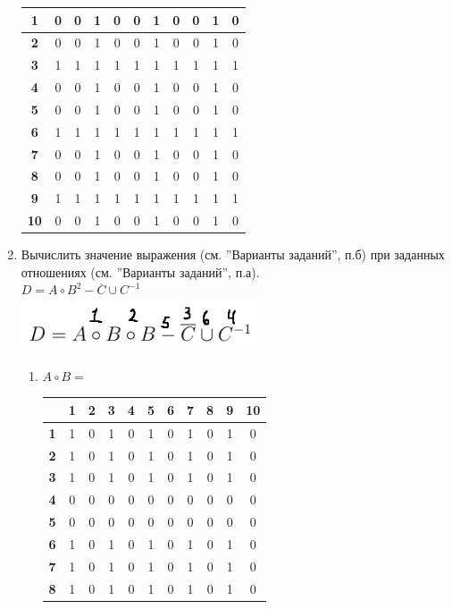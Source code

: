 \documentclass[a4paper,14pt]{extarticle}
\begin{document}
\begin{enumerate}[label=1.\arabic*.]
\begin{center}
\begin{tabular}{|c|c|c|c|c|c|c|c|c|c|c|}
    			\hline\textbf{1}&0&0&1&0&0&1&0&0&1&0\\
    			\hline\textbf{2}&0&0&1&0&0&1&0&0&1&0\\
    			\hline\textbf{3}&1&1&1&1&1&1&1&1&1&1\\
    			\hline\textbf{4}&0&0&1&0&0&1&0&0&1&0\\
    			\hline\textbf{5}&0&0&1&0&0&1&0&0&1&0\\
    			\hline\textbf{6}&1&1&1&1&1&1&1&1&1&1\\
    			\hline\textbf{7}&0&0&1&0&0&1&0&0&1&0\\
    			\hline\textbf{8}&0&0&1&0&0&1&0&0&1&0\\
    			\hline\textbf{9}&1&1&1&1&1&1&1&1&1&1\\
    			\hline\textbf{10}&0&0&1&0&0&1&0&0&1&0\\
    			\hline
    		\end{tabular}
    	\end{center}
    	\bigbreak
    \item Вычислить значение выражения (см. ”Варианты заданий”, п.б) при заданных отношениях (см. ”Варианты заданий”, п.а).\\
    $D=A\circ B^2 - \overline{C} \cup C^{-1}$\\
    \includegraphics[width=70mm]{1.2}\\
    \begin{enumerate}[1) ]\item 
	$A\circ B = $  \begin{tabular}{|c|c|c|c|c|c|c|c|c|c|c|}
		\hline
		&\textbf{1}&\textbf{2}&\textbf{3}&\textbf{4}&\textbf{5}&\textbf{6}&\textbf{7}&\textbf{8}&\textbf{9}&\textbf{10}\\
		\hline\textbf{1}&1&0&1&0&1&0&1&0&1&0\\
		\hline\textbf{2}&1&0&1&0&1&0&1&0&1&0\\
		\hline\textbf{3}&1&0&1&0&1&0&1&0&1&0\\
		\hline\textbf{4}&0&0&0&0&0&0&0&0&0&0\\
		\hline\textbf{5}&0&0&0&0&0&0&0&0&0&0\\
		\hline\textbf{6}&1&0&1&0&1&0&1&0&1&0\\
		\hline\textbf{7}&1&0&1&0&1&0&1&0&1&0\\
		\hline\textbf{8}&1&0&1&0&1&0&1&0&1&0\\

\end{tabular}
\end{enumerate}
\end{enumerate}
\end{document}
